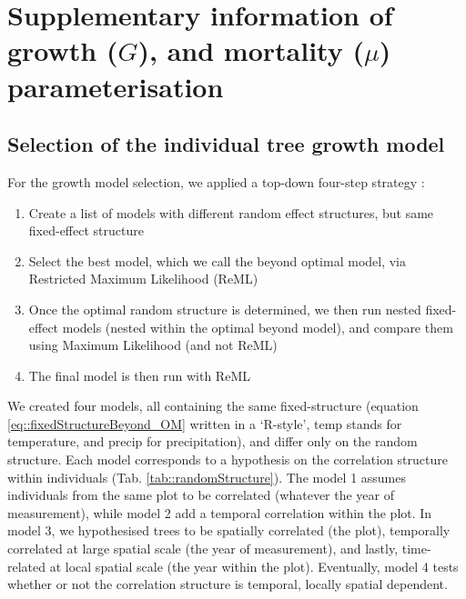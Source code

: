 \section{Supplementary information of growth ($ G $), and mortality ($ \mu $) parameterisation} \label{app::glmm}
\begin{refsection}
\subsection{Selection of the individual tree growth model}
For the growth model selection, we applied a top-down four-step strategy \citep[Chapter 5]{Zuur2009}:
\begin{enumerate}
	\item Create a list of models with different random effect structures, but same fixed-effect structure
	\item Select the best model, which we call the beyond optimal model, via Restricted Maximum Likelihood (ReML)
	\item Once the optimal random structure is determined, we then run nested fixed-effect models (nested within the optimal beyond model), and compare them using Maximum Likelihood (and not ReML)
	\item The final model is then run with ReML
\end{enumerate}

We created four models, all containing the same fixed-structure (equation \eqref{eq::fixedStructureBeyond_OM} written in a `R-style', temp stands for temperature, and precip for precipitation), and differ only on the random structure. Each model corresponds to a hypothesis on the correlation structure within individuals (Tab. \ref{tab::randomStructure}). The model 1 assumes individuals from the same plot to be correlated (whatever the year of measurement), while model 2 add a temporal correlation within the plot. In model 3, we hypothesised trees to be spatially correlated (the plot), temporally correlated at large spatial scale (the year of measurement), and lastly, time-related at local spatial scale (the year within the plot). Eventually, model 4 tests whether or not the correlation structure is temporal, locally spatial dependent.


\end{refsection}

